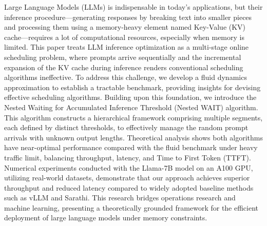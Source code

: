Large Language Models (LLMs) is indispensable in today's applications, but their inference procedure—generating responses by breaking text into smaller pieces and processing them using a memory-heavy element named Key-Value (KV) cache—requires a lot of computational resources, especially when memory is limited. This paper treats LLM inference optimization as a multi-stage online scheduling problem, where prompts arrive sequentially and the incremental expansion of the KV cache during inference renders conventional scheduling algorithms ineffective. To address this challenge, we develop a fluid dynamics approximation to establish a tractable benchmark, providing insights for devising effective scheduling algorithms. Building upon this foundation, we introduce the Nested Waiting for Accumulated Inference Threshold (Nested WAIT) algorithm. This algorithm constructs a hierarchical framework comprising multiple segments, each defined by distinct thresholds, to effectively manage the random prompt arrivals with unknown output lengths. Theoretical analysis shows both algorithms have near-optimal performance compared with the fluid benchmark under heavy traffic limit, balancing throughput, latency, and Time to First Token (TTFT). Numerical experiments conducted with the Llama-7B model on an A100 GPU, utilizing real-world datasets, demonstrate that our approach achieves superior throughput and reduced latency compared to widely adopted baseline methods such as vLLM and Sarathi. This research bridges operations research and machine learning, presenting a theoretically grounded framework for the efficient deployment of large language models under memory constraints.